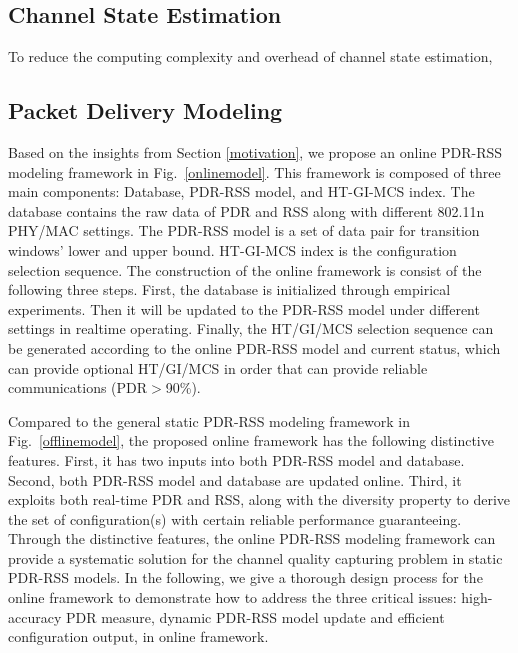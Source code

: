 \documentclass[journal,onecolumn,12pt]{IEEEtran}
\begin{document}
\subsection{Channel State Estimation} \label{sect:estimation}
To reduce the computing complexity and overhead of channel state estimation,

\subsection{Packet Delivery Modeling} \label{sect:modeling}
Based on the insights from Section \ref{motivation}, we propose an online PDR-RSS modeling framework in Fig.~\ref{onlinemodel}. This framework is composed of three main components: Database, PDR-RSS model, and HT-GI-MCS index. The database contains the raw data of PDR and RSS along with different 802.11n PHY/MAC settings. The PDR-RSS model is a set of data pair for transition windows' lower and upper bound. HT-GI-MCS index is the configuration selection sequence. The construction of the online framework is consist of the following three steps. First, the database is initialized through empirical experiments. Then it will be updated to the PDR-RSS model under different settings in realtime operating. Finally, the HT/GI/MCS selection sequence can be generated according to the online PDR-RSS model and current status, which can provide optional HT/GI/MCS in order that can provide reliable communications (PDR$>$90\%).

Compared to the general static PDR-RSS modeling framework in Fig.~\ref{offlinemodel}, the proposed online framework has the following distinctive features. First, it has two inputs into both PDR-RSS model and database. Second, both PDR-RSS model and database are updated online. Third, it exploits both real-time PDR and RSS, along with the diversity property to derive the set of configuration(s) with certain reliable performance guaranteeing. Through the distinctive features, the online PDR-RSS modeling framework can provide a systematic solution for the channel quality capturing problem in static PDR-RSS models. In the following, we give a thorough design process for the online framework to demonstrate how to address the three critical issues: high-accuracy PDR measure, dynamic PDR-RSS model update and efficient configuration output, in online framework.
\end{document}
